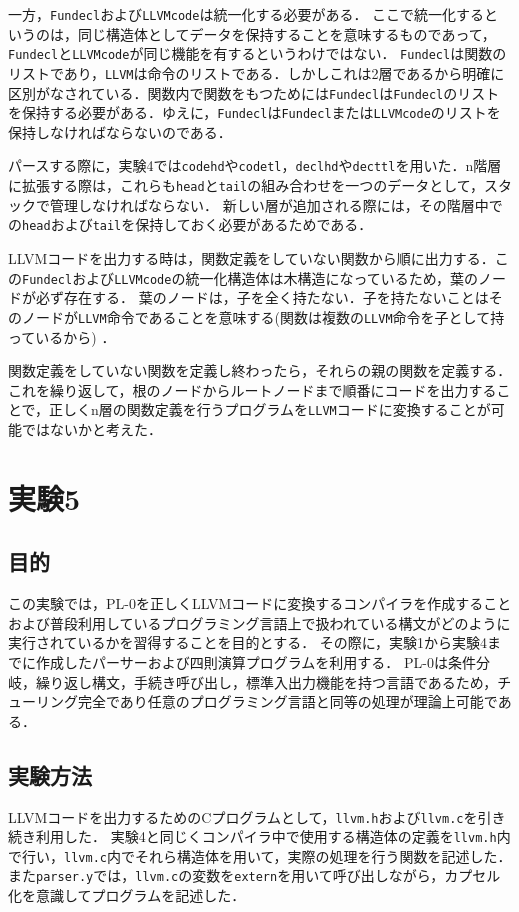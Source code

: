 \documentclass[uplatex]{jsarticle}
\begin{document}
一方，\verb#Fundecl#および\verb#LLVMcode#は統一化する必要がある．
ここで統一化するというのは，同じ構造体としてデータを保持することを意味するものであって，\verb#Fundecl#と\verb#LLVMcode#が同じ機能を有するというわけではない．
\verb#Fundecl#は関数のリストであり，\verb#LLVM#は命令のリストである．しかしこれは2層であるから明確に区別がなされている．関数内で関数をもつためには\verb#Fundecl#は\verb#Fundecl#のリストを保持する必要がある．ゆえに，\verb#Fundecl#は\verb#Fundecl#または\verb#LLVMcode#のリストを保持しなければならないのである．

パースする際に，実験4では\verb#codehd#や\verb#codetl#，\verb#declhd#や\verb#decttl#を用いた．n階層に拡張する際は，これらも\verb#head#と\verb#tail#の組み合わせを一つのデータとして，スタックで管理しなければならない．
新しい層が追加される際には，その階層中での\verb#head#および\verb#tail#を保持しておく必要があるためである．

LLVMコードを出力する時は，関数定義をしていない関数から順に出力する．この\verb#Fundecl#および\verb#LLVMcode#の統一化構造体は木構造になっているため，葉のノードが必ず存在する．
葉のノードは，子を全く持たない．子を持たないことはそのノードが\verb#LLVM#命令であることを意味する(関数は複数の\verb#LLVM#命令を子として持っているから)
．

関数定義をしていない関数を定義し終わったら，それらの親の関数を定義する．これを繰り返して，根のノードからルートノードまで順番にコードを出力することで，正しくn層の関数定義を行うプログラムを\verb#LLVM#コードに変換することが可能ではないかと考えた．

\section{実験5}
\subsection{目的}
この実験では，PL-0を正しくLLVMコードに変換するコンパイラを作成することおよび普段利用しているプログラミング言語上で扱われている構文がどのように実行されているかを習得することを目的とする．
その際に，実験1から実験4までに作成したパーサーおよび四則演算プログラムを利用する．
PL-0は条件分岐，繰り返し構文，手続き呼び出し，標準入出力機能を持つ言語であるため，チューリング完全であり任意のプログラミング言語と同等の処理が理論上可能である．
\subsection{実験方法}
LLVMコードを出力するためのCプログラムとして，\verb#llvm.h#および\verb#llvm.c#を引き続き利用した．
実験4と同じくコンパイラ中で使用する構造体の定義を\verb#llvm.h#内で行い，\verb#llvm.c#内でそれら構造体を用いて，実際の処理を行う関数を記述した．
また\verb#parser.y#では，\verb#llvm.c#の変数を\verb#extern#を用いて呼び出しながら，カプセル化を意識してプログラムを記述した．
\end{document}
